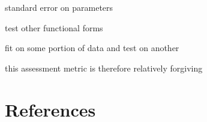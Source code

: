 \documentclass[preprint, 5p, times, twocolumn]{elsarticle}
\begin{document}
standard error on parameters

test other functional forms 

fit on some portion of data and test on another

this assessment metric is therefore relatively forgiving

\section{References}
\label{S:6}




\end{document}
